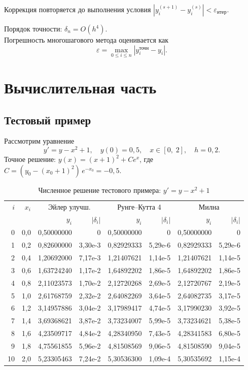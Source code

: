 \documentclass[a4paper,12pt]{article}
\begin{document}
Коррекция повторяется до выполнения условия $|y_i^{(s+1)} - y_i^{(s)}| < \varepsilon_{\text{итер}}$.

\noindent Порядок точности: $\delta_n = O(h^4)$.\\
Погрешность многошагового метода оценивается как
\begin{equation}
    \varepsilon = \max_{0 \le i \le n} |y_i^{\text{точн}} - y_i|.
\end{equation}

\section{Вычислительная часть}

\subsection{Тестовый пример}

Рассмотрим уравнение
\[
    y' = y - x^2 + 1, \quad y(0) = 0{,}5, \quad x \in [0,\; 2], \quad h = 0{,}2.
\]
Точное решение: $y(x) = (x+1)^2 + Ce^x$, где $C = (y_0 - (x_0+1)^2)\,e^{-x_0} = -0{,}5$.

\begin{table}[H]
\centering
\caption{Численное решение тестового примера: $y' = y - x^2 + 1$}
\small
\begin{tabular}{r|r|rr|rr|rr}
\toprule
$i$ & $x_i$ &
\multicolumn{2}{c|}{Эйлер улучш.} &
\multicolumn{2}{c|}{Рунге--Кутта 4} &
\multicolumn{2}{c}{Милна} \\
 & & $y_i$ & $|\delta_i|$ & $y_i$ & $|\delta_i|$ & $y_i$ & $|\delta_i|$ \\
\midrule
0 & 0,0 & 0,50000000 & 0          & 0,50000000 & 0          & 0,50000000 & 0          \\
1 & 0,2 & 0,82600000 & 3,30e-3    & 0,82929333 & 5,29e-6    & 0,82929333 & 5,29e-6    \\
2 & 0,4 & 1,20692000 & 7,17e-3    & 1,21407621 & 1,14e-5    & 1,21407621 & 1,14e-5    \\
3 & 0,6 & 1,63724240 & 1,17e-2    & 1,64892202 & 1,86e-5    & 1,64892202 & 1,86e-5    \\
4 & 0,8 & 2,11023573 & 1,70e-2    & 2,12720268 & 2,69e-5    & 2,12720767 & 2,19e-5    \\
5 & 1,0 & 2,61768759 & 2,32e-2    & 2,64082269 & 3,64e-5    & 2,64082735 & 3,17e-5    \\
6 & 1,2 & 3,14957886 & 3,04e-2    & 3,17989417 & 4,74e-5    & 3,17990230 & 3,92e-5    \\
7 & 1,4 & 3,69368621 & 3,87e-2    & 3,73234007 & 5,99e-5    & 3,73234621 & 5,38e-5    \\
8 & 1,6 & 4,23509717 & 4,84e-2    & 4,28340950 & 7,43e-5    & 4,28341583 & 6,80e-5    \\
9 & 1,8 & 4,75561855 & 5,96e-2    & 4,81508569 & 9,06e-5    & 4,81508590 & 9,04e-5    \\
10& 2,0 & 5,23305463 & 7,24e-2    & 5,30536300 & 1,09e-4    & 5,30535692 & 1,15e-4    \\
\bottomrule
\end{tabular}
\end{table}
\end{document}
